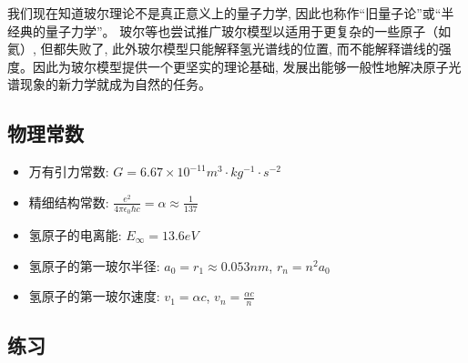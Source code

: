 

我们现在知道玻尔理论不是真正意义上的量子力学,
因此也称作``旧量子论''或``半经典的量子力学''。
玻尔等也尝试推广玻尔模型以适用于更复杂的一些原子（如氦）,
但都失败了, 此外玻尔模型只能解释氢光谱线的位置,
而不能解释谱线的强度。因此为玻尔模型提供一个更坚实的理论基础,
发展出能够一般性地解决原子光谱现象的新力学就成为自然的任务。

\subsection*{物理常数}

\begin{itemize}
  \item 万有引力常数: $G = 6.67 \times 10^{ - 11} m^3 \cdot kg^{-1} \cdot s^{-2} $

\item 精细结构常数: $\frac{e^2}{4 \pi \epsilon_0 \hbar c} = \alpha \approx \frac{1}{137}$

  \item 氢原子的电离能: $E_{\infty} = 13.6eV$
  \item 氢原子的第一玻尔半径: $a_0 = r_1 \approx 0.053 nm$, $r_n = n^2 a_0$

  \item 氢原子的第一玻尔速度: $v_1 = \alpha c$, $v_n = \frac{\alpha c}{n}$
\end{itemize}


\subsection*{练习}


